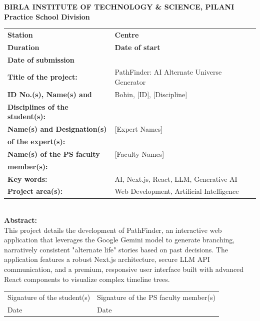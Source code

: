 \documentclass[12pt,a4paper]{report}
\begin{document}
\newpage
\begin{center}
    {\large \textbf{BIRLA INSTITUTE OF TECHNOLOGY \& SCIENCE, PILANI}}\\
    {\large \textbf{Practice School Division}}
\end{center}
\vspace{1cm}
\noindent
\begin{tabular}{@{}p{}p{}@{}}
\textbf{Station} & \textbf{Centre} \\[0.5cm]
\textbf{Duration} & \textbf{Date of start} \\[0.5cm]
\textbf{Date of submission} & \\[0.5cm]
\textbf{Title of the project:} & PathFinder: AI Alternate Universe Generator \\[0.5cm]
\textbf{ID No.(s), Name(s) and} & Bohin, [ID], [Discipline] \\
\textbf{Disciplines of the student(s):} & \\[0.5cm]
\textbf{Name(s) and Designation(s)} & [Expert Names] \\
\textbf{of the expert(s):} & \\[0.5cm]
\textbf{Name(s) of the PS faculty} & [Faculty Names] \\
\textbf{member(s):} & \\[0.5cm]
\textbf{Key words:} & AI, Next.js, React, LLM, Generative AI \\[0.5cm]
\textbf{Project area(s):} & Web Development, Artificial Intelligence \\[0.5cm]
\end{tabular}\\[0.5cm]
\textbf{Abstract:}\\
This project details the development of PathFinder, an interactive web application that leverages the Google Gemini model to generate branching, narratively consistent "alternate life" stories based on past decisions. The application features a robust Next.js architecture, secure LLM API communication, and a premium, responsive user interface built with advanced React components to visualize complex timeline trees.
\vspace{1.5cm}

\noindent
\begin{tabular}{@{}p{}p{}@{}}
Signature of the student(s) & Signature of the PS faculty member(s) \\[1cm]
Date & Date
\end{tabular}
\end{document}
